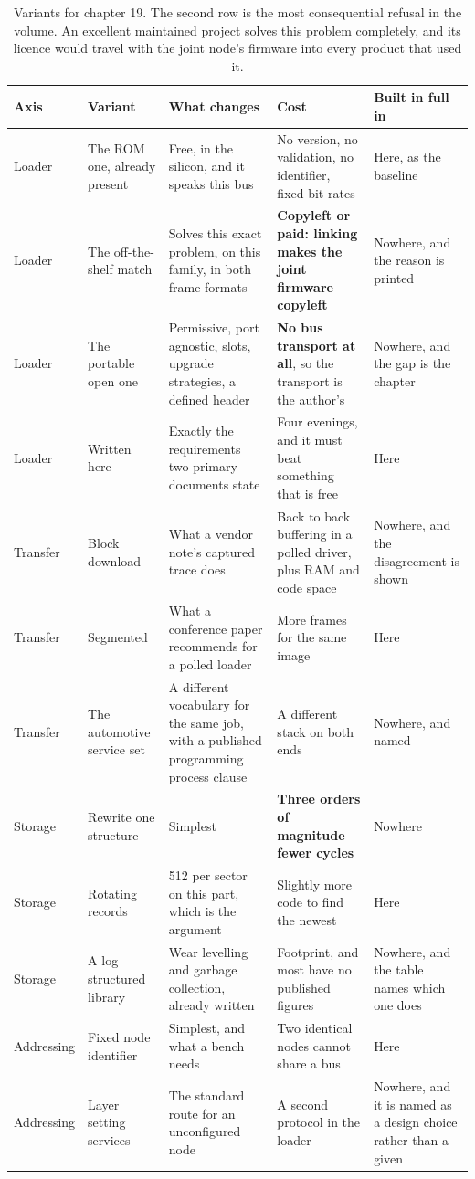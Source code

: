\begin{table}[H]\centering\small
\begin{tabular}{p{24mm}p{26mm}p{44mm}p{22mm}p{20mm}}
\toprule
Axis & Variant & What changes & Cost & Built in full in \\
\midrule
Loader & The ROM one, already present & Free, in the silicon, and it speaks this bus & No version, no validation, no identifier, fixed bit rates & Here, as the baseline \\
Loader & The off-the-shelf match & Solves this exact problem, on this family, in both frame formats & \textbf{Copyleft or paid: linking makes the joint firmware copyleft} & Nowhere, and the reason is printed \\
Loader & The portable open one & Permissive, port agnostic, slots, upgrade strategies, a defined header & \textbf{No bus transport at all}, so the transport is the author's & Nowhere, and the gap is the chapter \\
Loader & Written here & Exactly the requirements two primary documents state & Four evenings, and it must beat something that is free & Here \\
Transfer & Block download & What a vendor note's captured trace does & Back to back buffering in a polled driver, plus RAM and code space & Nowhere, and the disagreement is shown \\
Transfer & Segmented & What a conference paper recommends for a polled loader & More frames for the same image & Here \\
Transfer & The automotive service set & A different vocabulary for the same job, with a published programming process clause & A different stack on both ends & Nowhere, and named \\
Storage & Rewrite one structure & Simplest & \textbf{Three orders of magnitude fewer cycles} & Nowhere \\
Storage & Rotating records & 512 per sector on this part, which is the argument & Slightly more code to find the newest & Here \\
Storage & A log structured library & Wear levelling and garbage collection, already written & Footprint, and most have no published figures & Nowhere, and the table names which one does \\
Addressing & Fixed node identifier & Simplest, and what a bench needs & Two identical nodes cannot share a bus & Here \\
Addressing & Layer setting services & The standard route for an unconfigured node & A second protocol in the loader & Nowhere, and it is named as a design choice rather than a given \\
\bottomrule
\end{tabular}
\caption{Variants for chapter 19. The second row is the most consequential refusal in the volume. An excellent maintained project solves this problem completely, and its licence would travel with the joint node's firmware into every product that used it.}
\end{table}


